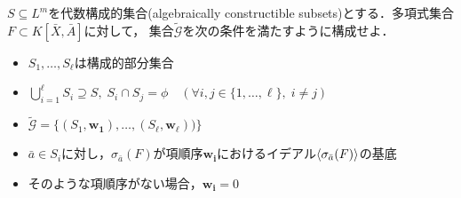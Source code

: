 \newpage
\begin{problem}
	$S \subseteq L^m$を代数構成的集合(algebraically constructible subsets)とする．多項式集合$F \subset K[\bar{X}, \bar{A}]$に対して，
	集合$\tilde{\mathcal{G}}$を次の条件を満たすように構成せよ．
	\begin{itemize}
		\item $S_1, \dots, S_\ell$は構成的部分集合
		\item $\displaystyle \bigcup_{i=1}^\ell S_i \supseteq S, \; S_i \cap S_j = \phi \quad (\forall i, j \in \{1, \dots, \ell\}, \; i \ne j)$
		\item $\tilde{\mathcal{G}} = \{(S_1, \bm{w_1}), \dots, (S_\ell, \bm{w_\ell}))\}$
		\item $\bar{a} \in S_i$に対し，$\sigma_{\bar{a}}(F)$が項順序$\bm{w_i}$におけるイデアル$\langle \sigma_{\bar{a}}(F) \rangle$の\groebner{}基底
		\item そのような項順序がない場合，$\bm{w_i} = 0$
	\end{itemize}
\end{problem}











